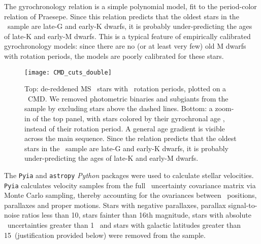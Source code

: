 The \citet{angus2019} gyrochronology relation is a simple polynomial model,
fit to the period-color relation of Praesepe.
Since this relation predicts that the oldest stars in the \mct\ sample are
late-G and early-K dwarfs, it is probably under-predicting the ages of late-K
and early-M dwarfs.
This is a typical feature of empirically calibrated gyrochronology models:
since there are no (or at least very few) old M dwarfs with rotation periods,
the models are poorly calibrated for these stars.
\begin{figure}
  \caption{
      Top: de-reddened MS \kepler\ stars with \mct\ rotation periods, plotted
    on a \gaia\ CMD.
    We removed photometric binaries and subgiants from the sample by excluding
    stars above the dashed lines.
    Bottom: a zoom-in of the top panel, with stars colored by their
    gyrochronal age \citep{angus2019}, instead of their rotation period.
    A general age gradient is visible across the main sequence.
    Since the \citet{angus2019} relation predicts that the oldest stars in
    the \mct\ sample are late-G and early-K dwarfs, it is probably
    under-predicting the ages of late-K and early-M dwarfs.
}
  \centering
    \texttt{[image: CMD\_cuts\_double]}
\label{fig:age_gradient}
\end{figure}

The {\tt Pyia} \citep{price-whelan_2018} and {\tt astropy} \citep{astropy2013,
astropy2018} {\it Python} packages were used to calculate stellar velocities.
{\tt Pyia} calculates velocity samples from the full \gaia\ uncertainty
covariance matrix via Monte Carlo sampling, thereby accounting for the
ovariances between \gaia\ positions, parallaxes and proper motions.
Stars with negative parallaxes, parallax signal-to-noise ratios less than 10,
stars fainter than 16th magnitude, stars with absolute \vb\ uncertainties
greater than 1 \kms\, and stars with galactic latitudes greater than
15\degrees\ (justification provided below) were removed from the sample.

